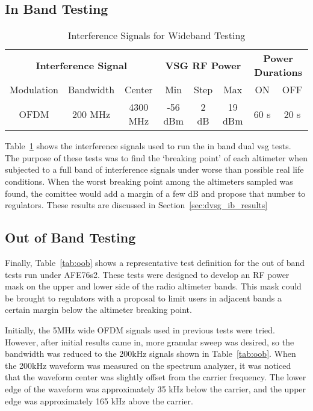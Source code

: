 \subsection{In Band Testing}
\begin{table}[]
\begin{tabular}{c|c|c|c|c|c|c|c}
\multicolumn{3}{c|}{\textbf{Interference Signal}} & \multicolumn{3}{c|}{\textbf{VSG RF Power}} & \multicolumn{2}{c}{\textbf{Power Durations}} \\
Modulation    & Bandwidth   & Center     & Min         & Step    & Max       & ON                & OFF              \\ \hline
OFDM          & 200 MHz     & 4300 MHz   & -56 dBm     & 2 dB    & 19 dBm    & 60 s              & 20 s            
\end{tabular}
\caption{Interference Signals for Wideband Testing}
\label{tab:Wideband}
\end{table}


Table~\ref{tab:Wideband} shows the interference signals used to run the in band dual vsg tests. The purpose of these tests was to find the `breaking point' of each altimeter when subjected to a full band of interference signals under worse than possible real life conditions. When the worst breaking point among the altimeters sampled was found, the comittee would add a margin of a few dB and propose that number to regulators. These results are discussed in Section~\ref{sec:dvsg_ib_results}
\subsection{Out of Band Testing}
Finally, Table~\ref{tab:oob} shows a representative test definition for the out of band tests run under AFE76s2. These tests were designed to develop an RF power mask on the upper and lower side of the radio altimeter bands. This mask could be brought to regulators with a proposal to limit users in adjacent bands a certain margin below the altimeter breaking point. 

Initially, the 5MHz wide OFDM signals used in previous tests were tried. However, after initial results came in, more granular sweep was desired, so the bandwidth was reduced to the 200kHz signals shown in Table~\ref{tab:oob}. When the 200kHz waveform was measured on the spectrum analyzer, it was noticed that the waveform center was slightly offset from the carrier frequency. The lower edge of the waveform was approximately 35 kHz below the carrier, and the upper edge was approximately 165 kHz above the carrier. 

